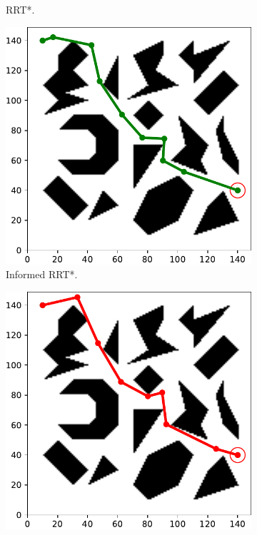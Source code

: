 \documentclass{ctuthesis}
\begin{document}
\begin{figure}[!ht]
\begin{subfigure}[b]{0.48\textwidth}
    \caption{RRT*.}
  \end{subfigure}     
  \begin{subfigure}[b]{0.32\textwidth}
    \includegraphics[width=\textwidth]{figChap5/Maze_clutter_first_solution_InformedRRTstar.pdf}  
    \caption{Informed RRT*.}
  \end{subfigure}  
  \begin{subfigure}[b]{0.32\textwidth}
    \includegraphics[width=\textwidth]{figChap5/Maze_clutter_first_solution_RRTsharp.pdf}  

\end{subfigure}
\end{figure}
\end{document}
